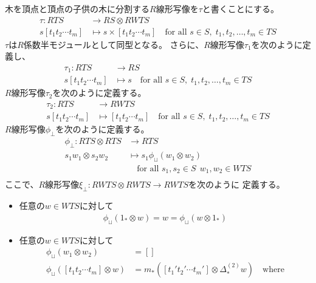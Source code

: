 	木を頂点と頂点の子供の木に分割する$R$線形写像を$\tau$と書くことにする。
	\begin{equation}\begin{split} %
		\tau: RTS &\to RS\otimes RWTS \\
		s[t_1t_2\cdots t_m] &\mapsto s\times [t_1t_2\cdots t_m] \quad\text{for all }s\in S,\;t_1,t_2,\dots,t_m\in TS
	\end{split}\end{equation} %
	$\tau$は$R$係数半モジュールとして同型となる。
	さらに、$R$線形写像$\tau_1$を次のように定義し、
	\begin{equation}\begin{split} %
		\tau_1: RTS &\to RS \\
		s[t_1t_2\cdots t_m] &\mapsto s \quad\text{for all }s\in S,\;t_1,t_2,\dots,t_m\in TS
	\end{split}\end{equation} %
	$R$線形写像$\tau_2$を次のように定義する。
	\begin{equation}\begin{split} %
		\tau_2: RTS &\to RWTS \\
		s[t_1t_2\cdots t_m] &\mapsto [t_1t_2\cdots t_m] \quad\text{for all }s\in S,\;t_1,t_2,\dots,t_m\in TS
	\end{split}\end{equation} %
	$R$線形写像$\phi_\perp$を次のように定義する。
	\begin{equation}\begin{split} %
		\phi_\perp: RTS\otimes RTS &\to RTS \\
			s_1w_1\otimes s_2w_2 &\mapsto s_1\phi_\sqcup(w_1\otimes w_2) \\
			& \quad\text{for all }s_1,s_2\in S\,\;w_1,w_2\in WTS \\
	\end{split}\end{equation} %
	ここで、$R$線形写像$\xi_\perp:RWTS\otimes RWTS\to RWTS$を次のように
	定義する。
	\begin{itemize} %
		\item 任意の$w\in WTS$に対して
		\begin{equation}\begin{split} %
			\phi_\sqcup(1_*\otimes w) = w = \phi_\sqcup(w\otimes 1_*) 
		\end{split}\end{equation} %
		\item 任意の$w\in WTS$に対して
		\begin{equation}\begin{split} %
			\phi_\sqcup(w_1\otimes w_2) &= []　\\
			\phi_\sqcup([t_1t_2\cdots t_m]\otimes w)
			&= m_*([t_1't_2'\cdots t_m']\otimes \Delta_*^{(2)}w) \quad\text{where} \\
		\end{split}\end{equation} %
	\end{itemize} %
